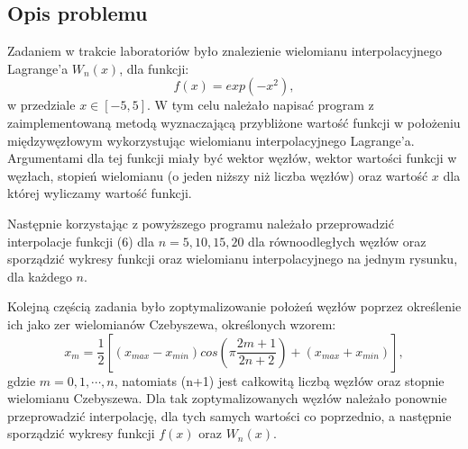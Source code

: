 \documentclass{article}
\begin{document}
\subsection{Opis problemu}
Zadaniem w trakcie laboratoriów było znalezienie wielomianu interpolacyjnego Lagrange'a $W_n(x)$, dla funkcji:
\begin{equation}
f(x) = exp(-x^2),
\end{equation}
w przedziale $x \in [-5, 5]$. W tym celu należało napisać program z zaimplementowaną metodą wyznaczającą przybliżone wartość funkcji w położeniu międzywęzłowym wykorzystując wielomianu interpolacyjnego Lagrange'a. Argumentami dla tej funkcji miały być wektor węzłów, wektor wartości funkcji w węzłach, stopień wielomianu (o jeden niższy niż liczba węzłów) oraz wartość $x$ dla której wyliczamy wartość funkcji. 
\par Następnie korzystając z powyższego programu należało przeprowadzić interpolacje funkcji (6) dla  $n = 5, 10, 15, 20$ dla równoodległych węzłów oraz sporządzić wykresy funkcji oraz wielomianu interpolacyjnego na jednym rysunku, dla każdego $n$.
\par Kolejną częścią zadania było zoptymalizowanie położeń węzłów poprzez określenie ich jako zer wielomianów Czebyszewa, określonych wzorem:
\begin{equation}
x_m = \frac{1}{2} [(x_{max} - x_{min}) cos(\pi \frac{2m +1}{2n + 2}) + (x_{max} + x_{min}) ],
\end{equation}
gdzie $m = 0, 1, \cdots, n$, natomiats (n+1) jest całkowitą liczbą węzłów oraz stopnie wielomianu Czebyszewa. Dla tak zoptymalizowanych węzłów należało ponownie przeprowadzić interpolację, dla tych samych wartości co poprzednio, a następnie sporządzić wykresy funkcji $f(x)$ oraz $W_n(x)$.
\end{document}

